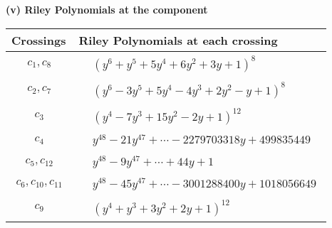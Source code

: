 \documentclass[1p]{elsarticle_modified}
\theoremstyle{definition}
\begin{document}
\flushleft \textbf{(v) Riley Polynomials at the component}\newline \\
\begin{tabular}{m{50pt}|m{274pt}}
Crossings & \hspace{64pt}Riley Polynomials at each crossing \\
\hline $$\begin{aligned}c_{1},c_{8}\end{aligned}$$&$\begin{aligned}
&(y^6+y^5+5 y^4+6 y^2+3 y+1)^8
\end{aligned}$\\
\hline $$\begin{aligned}c_{2},c_{7}\end{aligned}$$&$\begin{aligned}
&(y^6-3 y^5+5 y^4-4 y^3+2 y^2- y+1)^8
\end{aligned}$\\
\hline $$\begin{aligned}c_{3}\end{aligned}$$&$\begin{aligned}
&(y^4-7 y^3+15 y^2-2 y+1)^{12}
\end{aligned}$\\
\hline $$\begin{aligned}c_{4}\end{aligned}$$&$\begin{aligned}
&y^{48}-21 y^{47}+\cdots-2279703318 y+499835449
\end{aligned}$\\
\hline $$\begin{aligned}c_{5},c_{12}\end{aligned}$$&$\begin{aligned}
&y^{48}-9 y^{47}+\cdots+44 y+1
\end{aligned}$\\
\hline $$\begin{aligned}c_{6},c_{10},c_{11}\end{aligned}$$&$\begin{aligned}
&y^{48}-45 y^{47}+\cdots-3001288400 y+1018056649
\end{aligned}$\\
\hline $$\begin{aligned}c_{9}\end{aligned}$$&$\begin{aligned}
&(y^4+y^3+3 y^2+2 y+1)^{12}
\end{aligned}$\\
\hline
\end{tabular}\\~\\
\end{document}
